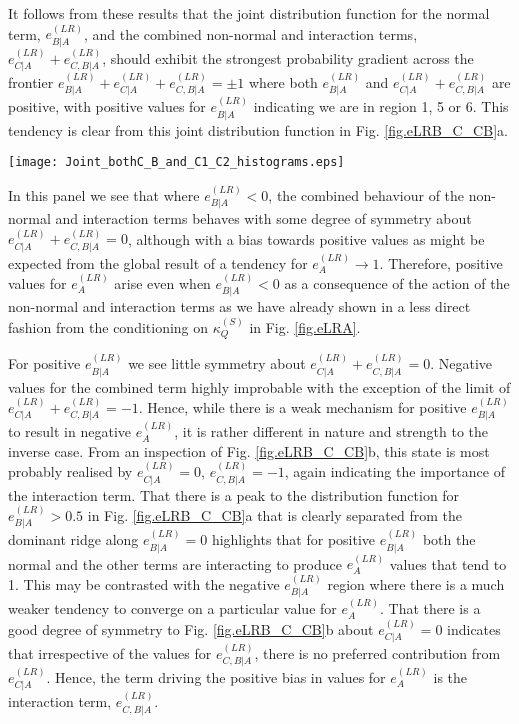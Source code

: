 \documentclass[preprint,amssymb,amsmath,aip,cha]{revtex4-1}
\begin{document}
It follows from these results that the joint distribution function for the normal  term, $e^{(LR)}_{B|A}$, and the combined non-normal and interaction terms, $e^{(LR)}_{C|A} + e^{(LR)}_{C,B|A}$, should exhibit the strongest probability gradient across the frontier $e^{(LR)}_{B|A} + e^{(LR)}_{C|A} + e^{(LR)}_{C,B|A} = \pm 1$ where both $e^{(LR)}_{B|A}$ and $e^{(LR)}_{C|A} + e^{(LR)}_{C,B|A}$ are positive, with positive values for $e^{(LR)}_{B|A}$ indicating we are in region 1, 5 or 6. This tendency is clear from this joint distribution function in Fig. \ref{fig.eLRB_C_CB}a.

\begin{figure*}
  \texttt{[image: Joint\_bothC\_B\_and\_C1\_C2\_histograms.eps]}
\caption{Joint distribution functions for $e^{(LR)}_{B|A}$ and $e^{(LR)}_{C|A} + e^{(LR)}_{C,B|A}$ (a) as well as $e^{(LR)}_{C|A}$ and $e^{(LR)}_{C,B|A}$ (b). Contours are on a $\mbox{log}_{10}$ scale.
}
\label{fig.eLRB_C_CB}       %
\end{figure*}

In this panel we see that where $e^{(LR)}_{B|A} < 0$, the combined behaviour of the non-normal and interaction terms behaves with some degree of symmetry about $e^{(LR)}_{C|A} + e^{(LR)}_{C,B|A} = 0$, although with a bias towards positive values as might be expected from the global result of a tendency for $e^{(LR)}_{A} \to 1$. Therefore, positive values for $e^{(LR)}_{A}$ arise even when $e^{(LR)}_{B|A} < 0$ as a consequence of the action of the non-normal and interaction terms as we have already shown in a less direct fashion from the conditioning on $\kappa_{Q}^{(S)}$ in Fig. \ref{fig.eLRA}. 

For positive $e^{(LR)}_{B|A}$ we see little symmetry about $e^{(LR)}_{C|A} + e^{(LR)}_{C,B|A} = 0$. Negative values for the combined term highly improbable with the exception of the limit of $e^{(LR)}_{C|A} + e^{(LR)}_{C,B|A} = -1$. Hence, while there is a weak mechanism for positive $e^{(LR)}_{B|A}$ to result in negative $e^{(LR)}_{A}$, it is rather different in nature and strength to the inverse case. From an inspection of Fig. \ref{fig.eLRB_C_CB}b, this state is most probably realised by $e^{(LR)}_{C|A} = 0$, $e^{(LR)}_{C,B|A} = -1$, again indicating the importance of the interaction term. That there is a peak to the distribution function for $e^{(LR)}_{B|A} > 0.5$ in Fig. \ref{fig.eLRB_C_CB}a that is clearly separated from the dominant ridge along $e^{(LR)}_{B|A} = 0$ highlights that for positive $e^{(LR)}_{B|A}$ both the normal and the other terms are interacting to produce $e^{(LR)}_{A}$ values that tend to 1. This may be contrasted with the negative $e^{(LR)}_{B|A}$ region where there is a much weaker tendency to converge on a particular value for $e^{(LR)}_{A}$. That there is a good degree of symmetry to Fig. \ref{fig.eLRB_C_CB}b about $e^{(LR)}_{C|A} = 0$ indicates that irrespective of the values for $e^{(LR)}_{C,B|A}$, there is no preferred contribution from $e^{(LR)}_{C|A}$. Hence, the term driving the positive bias in values for $e^{(LR)}_{A}$ is the interaction term, $e^{(LR)}_{C,B|A}$. 
\end{document}
